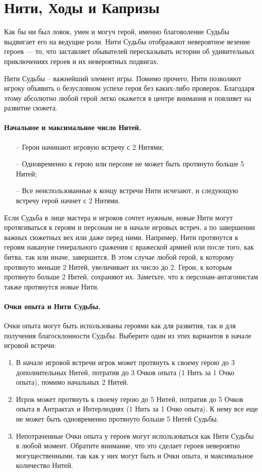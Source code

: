 \section{Нити, Ходы и Капризы}
Как бы ни был ловок, умен и могуч герой, именно благоволение Судьбы выдвигает его на ведущие роли. Нити Судьбы отображают невероятное везение героев — то,
что заставляет обывателей пересказывать истории об удивительных приключениях героев и их невероятных подвигах. 
\begin{tcolorbox}
    Нити Судьбы – важнейший элемент игры. Помимо прочего, Нити позволяют игроку объявить о безусловном успехе героя без каких-либо проверок. Благодаря этому абсолютно любой герой легко окажется в центре внимания и повлияет на развитие сюжета.
\end{tcolorbox}

\paragraph{Начальное и максимальное число Нитей.}
\begin{itemize}
    \item[--] Герои начинают игровую встречу с 2 Нитями;
    \item[--] Одновременно к герою или персоне не может быть протянуто больше 5 Нитей;
    \item[--] Все неиспользованные к концу встречи Нити исчезают, и следующую встречу герой начнет с 2 Нитями.
\end{itemize}
Если Судьба в лице мастера и игроков сочтет нужным, новые Нити могут протягиваться к героям и персонам не в начале игровых встреч, а по завершении важных сюжетных вех или даже перед ними. Например, Нити протянутся к героям накануне генерального сражения с вражеской армией или после того, как битва, так или иначе, завершится. В этом случае любой герой, к которому протянуто меньше 2 Нитей, увеличивает их число до 2. Герои, к которым протянуто больше 2 Нитей, сохраняют их. Заметьте, что к персонам-антагонистам также протянутся новые Нити.
\paragraph{Очки опыта и Нити Судьбы.} Очки опыта могут быть использованы героями как для развития, так и для получения благосклонности Судьбы. Выберите один из этих вариантов в начале игровой встречи:
\begin{enumerate}
    \item В начале игровой встречи игрок может протянуть к своему герою до 3 дополнительных Нитей, потратив до 3 Очков опыта (1 Нить за 1 Очко опыта), помимо начальных 2 Нитей.
    \item Игрок может протянуть к своему герою до 5 Нитей, потратив до 5 Очков опыта в Антрактах и Интерлюдиях (1 Нить за 1 Очко опыта). К нему все еще не может быть одновременно протянуто больше 5 Нитей Судьбы.
    \item Непотраченные Очки опыта у героев могут использоваться как Нити Судьбы в любой момент. Обратите внимание, что это сделает героев невероятно могущественными, так как у них могут быть и Очки опыта, и максимальное количество Нитей.
\end{enumerate}

